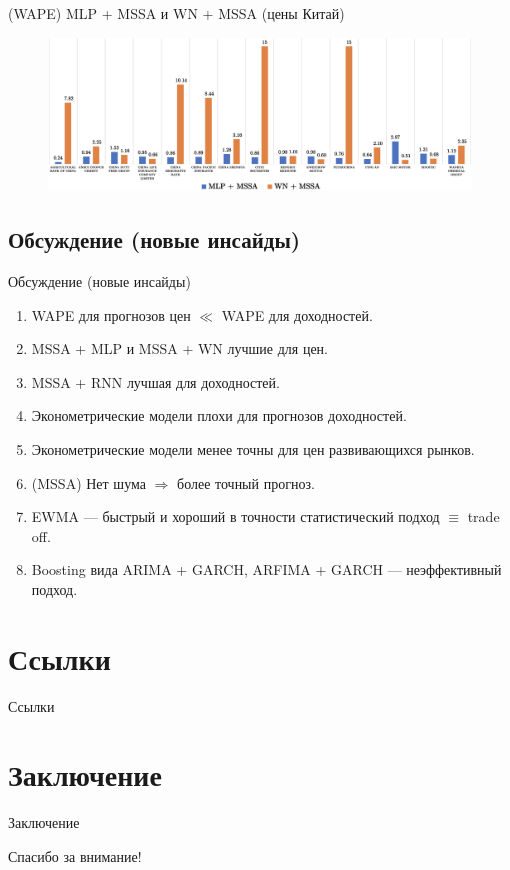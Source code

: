 \documentclass[11pt, aspectratio= 169]{beamer}
\begin{document}
	\begin{frame}{(WAPE) MLP + MSSA и WN + MSSA (цены Китай)}
		\begin{figure}[H]
			\includegraphics[width= 15cm]{./mlp_wn/ch.png}
		\end{figure}
	\end{frame}
	
	\subsection{Обсуждение (новые инсайды)}
	\begin{frame}{Обсуждение (новые инсайды)}
		\begin{enumerate}
			\item WAPE  для прогнозов цен $\ll$ WAPE для доходностей.
			\item MSSA + MLP и MSSA + WN лучшие для цен.
			\item MSSA + RNN лучшая для доходностей.
			\item Эконометрические модели плохи для прогнозов доходностей.
			\item Эконометрические модели менее точны для цен развивающихся рынков.
			\item (MSSA) Нет шума $\Rightarrow$ более точный прогноз.
			\item EWMA --- быстрый и хороший в точности статистический подход $\equiv$ trade off.
			\item Boosting вида ARIMA + GARCH, ARFIMA + GARCH --- неэффективный подход.
		\end{enumerate}
	\end{frame}
	
	\section{Ссылки}
	\begin{frame}[allowframebreaks]{Ссылки}
		
		
	\end{frame}
	
	\section{Заключение}
	\begin{frame}{Заключение}
		\begin{center}
			\LARGE
			Спасибо за внимание!
		\end{center}
	\end{frame}
\end{document}
